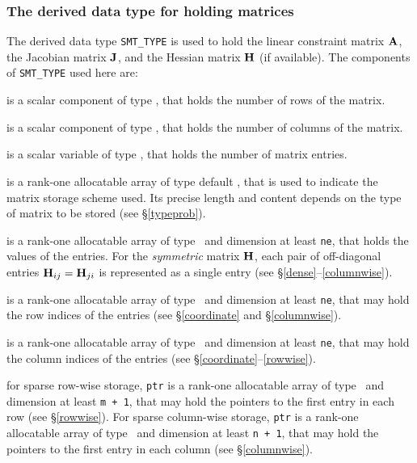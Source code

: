 \documentclass{galahad}
\begin{document}

\subsubsection{The derived data type for holding matrices}\label{typesmt}
The derived data type {\tt SMT\_TYPE} is used to hold the linear
constraint matrix ${\mathbf{A}}$, the Jacobian matrix ${\mathbf{J}}$, and the Hessian
matrix ${\mathbf{H}}$ (if available). The components of {\tt SMT\_TYPE}
used here are:

\begin{description}

 is a scalar component of type \integer, 
that holds the number of rows of the matrix.

 is a scalar component of type \integer, 
that holds the number of columns of the matrix. 
 
 is a scalar variable of type \integer, that
holds the number of matrix entries.

 is a rank-one allocatable array of type default \character, that
is used to indicate the matrix storage scheme used. Its precise length and
content depends on the type of matrix to be stored (see \S\ref{typeprob}).

 is a rank-one allocatable array of type \realdp\,
and dimension at least {\tt ne}, that holds the values of the entries.
For the {\em symmetric} matrix ${\mathbf{H}}$, each pair of off-diagonal entries
${\mathbf{H}}_{ij} = {\mathbf{H}}_{ji}$ is represented
as a single entry (see \S\ref{dense}--\ref{columnwise}).

 is a rank-one allocatable array of type \integer\ 
and dimension at least {\tt ne}, that may hold the row indices of the entries 
(see \S\ref{coordinate} and \S\ref{columnwise}).

 is a rank-one allocatable array of type \integer\ 
and dimension at least {\tt ne}, that may hold the column indices of the entries
(see \S\ref{coordinate}--\ref{rowwise}).

 for sparse row-wise storage, {\tt ptr} is a rank-one
allocatable array of type \integer\ and dimension at least
{\tt m + 1}, that may hold the pointers to the first entry in each row
(see \S\ref{rowwise}).  For sparse column-wise storage, {\tt ptr}
is a rank-one allocatable array of type \integer\ and
dimension at least {\tt n + 1}, that may hold the pointers to the
first entry in each column (see \S\ref{columnwise}).

\end{description}
\end{document}
